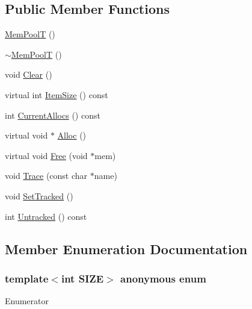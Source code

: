 \subsection*{Public Member Functions}
\begin{DoxyCompactItemize}
\item 
\hyperlink{classtinyxml2_1_1_mem_pool_t_a8a69a269ea72e292dde65309528ef64b}{Mem\+Pool\+T} ()
\item 
\hyperlink{classtinyxml2_1_1_mem_pool_t_ad6bb8346ad5b9a34f8f0051da5e3ed3f}{$\sim$\+Mem\+Pool\+T} ()
\item 
void \hyperlink{classtinyxml2_1_1_mem_pool_t_a469d55e82be97d5ffeff82dd001a7029}{Clear} ()
\item 
virtual int \hyperlink{classtinyxml2_1_1_mem_pool_t_a7ec8778fe99f6e332615a703be0b48bc}{Item\+Size} () const 
\item 
int \hyperlink{classtinyxml2_1_1_mem_pool_t_a56be11b7db6a7ef00db17088a7769aab}{Current\+Allocs} () const 
\item 
virtual void $\ast$ \hyperlink{classtinyxml2_1_1_mem_pool_t_aa9d785a48ffe6ea1be679bab13464486}{Alloc} ()
\item 
virtual void \hyperlink{classtinyxml2_1_1_mem_pool_t_a4f1a0c434e9e3d7391e5c16ed4ee8c70}{Free} (void $\ast$mem)
\item 
void \hyperlink{classtinyxml2_1_1_mem_pool_t_a0bc596f271e0f139822c534238b3f244}{Trace} (const char $\ast$name)
\item 
void \hyperlink{classtinyxml2_1_1_mem_pool_t_a7798932414916199a1bc0f9c3f368521}{Set\+Tracked} ()
\item 
int \hyperlink{classtinyxml2_1_1_mem_pool_t_a524b90d0edeac41964c06510757dce0f}{Untracked} () const 
\end{DoxyCompactItemize}


\subsection{Member Enumeration Documentation}
\hypertarget{classtinyxml2_1_1_mem_pool_t_a04cf45156e6f913f93972869ff8a1d94}{}\subsubsection[{anonymous enum}]{\setlength{\rightskip}{0pt plus 5cm}template$<$int S\+I\+Z\+E$>$ anonymous enum}\label{classtinyxml2_1_1_mem_pool_t_a04cf45156e6f913f93972869ff8a1d94}
\begin{Desc}
\item[Enumerator]\par
\begin{description}
\item[{\em 
\hypertarget{classtinyxml2_1_1_mem_pool_t_a04cf45156e6f913f93972869ff8a1d94a4eeedbaa09fc9968120af6190e9e0988}{}C\+O\+U\+N\+T\label{classtinyxml2_1_1_mem_pool_t_a04cf45156e6f913f93972869ff8a1d94a4eeedbaa09fc9968120af6190e9e0988}
}]\end{description}
\end{Desc}


